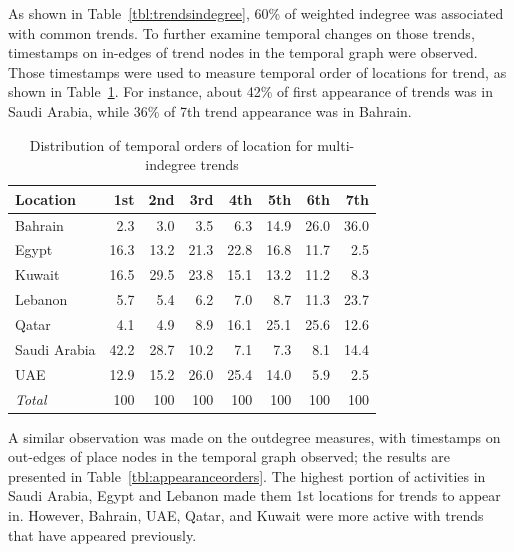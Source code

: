 \documentclass{llncs}
\begin{document}
As shown in Table~\ref{tbl:trendsindegree}, 60\% of weighted
indegree was associated with common trends. To further examine temporal
changes on those trends, timestamps on in-edges of trend nodes in the
temporal graph were observed. Those timestamps were used to measure
temporal order of locations for trend, as shown in
Table~\ref{tbl:temporders}. For instance, about 42\% of first
appearance of trends was in Saudi Arabia, while 36\% of 7th trend
appearance was in Bahrain.

\begin{table}[!h]
\centering
\caption{Distribution of temporal orders of location for multi-indegree trends}
\begin{tabular}{@{}lrrrrrrr@{}}
\toprule
Location & 1st & 2nd & 3rd & 4th & 5th & 6th & 7th \\ 
\midrule
Bahrain &          2.3 &    3.0 &    3.5 &  6.3 & 14.9 & 26.0 & 36.0 \\
Egypt &            16.3 & 13.2 & 21.3 & 22.8 & 16.8 & 11.7 &   2.5 \\
Kuwait &          16.5 & 29.5 & 23.8 & 15.1 & 13.2 & 11.2 &   8.3\\
Lebanon &         5.7 &   5.4 &   6.2 &   7.0 &   8.7 & 11.3 & 23.7 \\
Qatar &              4.1 &   4.9 &   8.9 & 16.1 & 25.1 & 25.6 & 12.6 \\
Saudi Arabia & 42.2 & 28.7 & 10.2 &   7.1 &   7.3 &   8.1 & 14.4 \\
UAE &              12.9 & 15.2 & 26.0 & 25.4 & 14.0 &   5.9 &   2.5\\
\midrule
{\emph{Total}} & 100 & 100 & 100 & 100 & 100 &  100 &   100\\
\bottomrule
\end{tabular}
\label{tbl:temporders}
\end{table}

A similar observation was made on the outdegree measures, with
timestamps on out-edges of place nodes in the temporal graph observed;
the results are presented in Table~\ref{tbl:appearanceorders}. The
highest portion of activities in Saudi Arabia, Egypt and Lebanon made
them 1st locations for trends to appear in. However, Bahrain, UAE, Qatar,
and Kuwait were more active with trends that have appeared previously.
\end{document}
